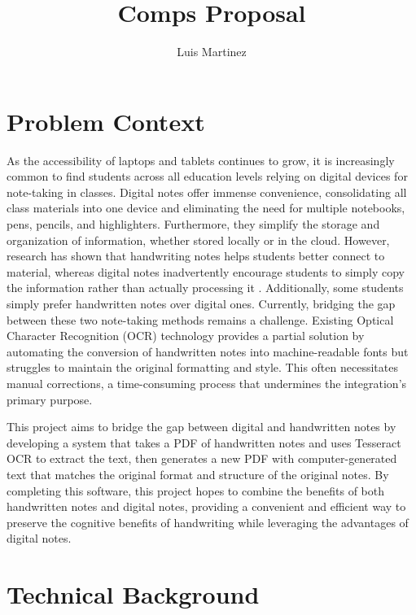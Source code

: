 \documentclass[10pt,twocolumn]{article}
\title{Comps Proposal}
\author{Luis Martinez}
\affiliation{Occidental College}
\begin{document}
\maketitle

\section{Problem Context}

As the accessibility of laptops and tablets continues to grow, it is increasingly common to find students across all education levels relying on digital devices for note-taking in classes. Digital notes offer immense convenience, consolidating all class materials into one device and eliminating the need for multiple notebooks, pens, pencils, and highlighters. Furthermore, they simplify the storage and organization of information, whether stored locally or in the cloud. However, research has shown that handwriting notes helps students better connect to material, whereas digital notes inadvertently encourage students to simply copy the information rather than actually processing it \cite{mueller2014pen}. Additionally, some students simply prefer handwritten notes over digital ones. Currently, bridging the gap between these two note-taking methods remains a challenge. Existing Optical Character Recognition (OCR) technology provides a partial solution by automating the conversion of handwritten notes into machine-readable fonts but struggles to maintain the original formatting and style. This often necessitates manual corrections, a time-consuming process that undermines the integration's primary purpose. 

This project aims to bridge the gap between digital and handwritten notes by developing a system that takes a PDF of handwritten notes and uses Tesseract OCR to extract the text, then generates a new PDF with computer-generated text that matches the original format and structure of the original notes. By completing this software, this project hopes to combine the benefits of both handwritten notes and digital notes, providing a convenient and efficient way to preserve the cognitive benefits of handwriting while leveraging the advantages of digital notes. 


\section{Technical Background}
\end{document}
